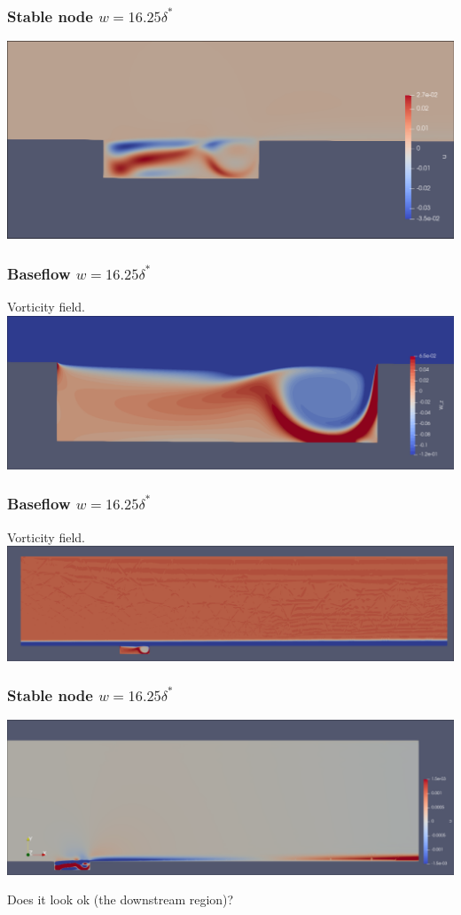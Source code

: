 \documentclass[
	aspectratio=169, %
	t, %
	onlytextwidth, %
	10pt, %
]{beamer}
\begin{document}
\begin{frame}
	\frametitle{Stable node $w=16.25\delta^*$}

	\centering
	\includegraphics[width=\linewidth]{Images/stablemodeGap16.25.png}
	
\end{frame}
\begin{frame}
	\frametitle{Baseflow $w=16.25\delta^*$}
	
	Vorticity field. 
	{	\centering
	\includegraphics[width=\linewidth]{Images/vorticitybaseflowGap_w16.15.png}}

\end{frame}
\begin{frame}
	\frametitle{Baseflow $w=16.25\delta^*$}
	
	Vorticity field. 
	{	\centering
	\includegraphics[width=\linewidth]{Images/vorticitybaseflow_w16.15.png}}
	
\end{frame}
\begin{frame}
	\frametitle{Stable node $w=16.25\delta^*$}

	\centering
	\includegraphics[width=\linewidth]{Images/stablemode16.25.png}

	Does it look ok (the downstream region)?
\end{frame}
\end{document}
